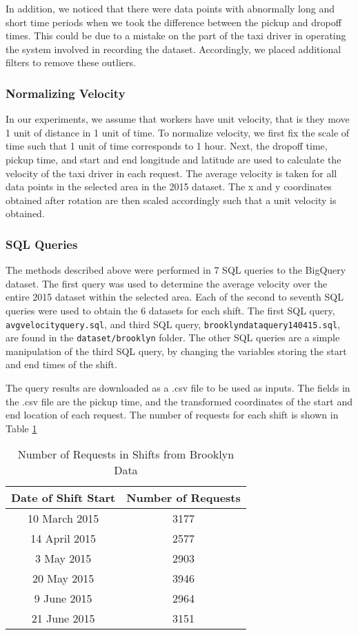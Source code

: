 \documentclass[urop]{socreport}
\begin{document}
In addition, we noticed that there were data points with abnormally long and short time periods when we took the difference between the pickup and dropoff times. This could be due to a mistake on the part of the taxi driver in operating the system involved in recording the dataset. Accordingly, we placed additional filters to remove these outliers.

\subsubsection{Normalizing Velocity}
In our experiments, we assume that workers have unit velocity, that is they move 1 unit of distance in 1 unit of time. To normalize velocity, we first fix the scale of time such that 1 unit of time corresponds to 1 hour. Next, the dropoff time, pickup time, and start and end longitude and latitude are used to calculate the velocity of the taxi driver in each request. The average velocity is taken for all data points in the selected area in the 2015 dataset. The x and y coordinates obtained after rotation are then scaled accordingly such that a unit velocity is obtained.


\subsubsection{SQL Queries}
The methods described above were performed in 7 SQL queries to the BigQuery dataset. The first query was used to determine the average velocity over the entire 2015 dataset within the selected area. Each of the second to seventh SQL queries were used to obtain the 6 datasets for each shift. The first SQL query, \verb|avgvelocityquery.sql|, and third SQL query, \verb|brooklyndataquery140415.sql|, are found in the \verb|dataset/brooklyn| folder. The other SQL queries are a simple manipulation of the third SQL query, by changing the variables storing the start and end times of the shift.

The query results are downloaded as a .csv file to be used as inputs. The fields in the .csv file are the pickup time, and the transformed coordinates of the start and end location of each request. The number of requests for each shift is shown in Table \ref{tab:numreq} 
\begin{table}[h]
    \centering
    \begin{tabular}{|c|c|}
        \hline
         \textbf{Date of Shift Start} & \textbf{Number of Requests}\\
         \hline
         10 March 2015 & 3177 \\
         \hline
         14 April 2015 & 2577 \\
         \hline
         3 May 2015 & 2903 \\
         \hline
         20 May 2015 & 3946 \\
         \hline
         9 June 2015 & 2964 \\
         \hline
         21 June 2015 & 3151 \\
        \hline
    \end{tabular}
    \caption{Number of Requests in Shifts from Brooklyn Data}
    \label{tab:numreq}
\end{table}
\end{document}
